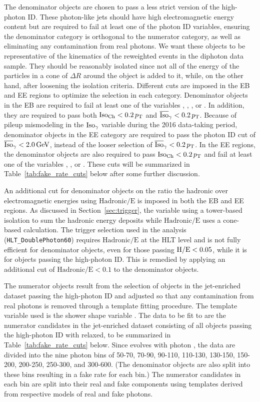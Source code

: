 The denominator objects are chosen to pass a less strict version of the high-\pt photon ID. These photon-like jets should have high electromagnetic energy content but are required to fail at least one of the photon ID variables, ensuring the denominator category is orthogonal to the numerator category, as well as eliminating any contamination from real photons. We want these objects to be representative of the kinematics of the reweighted events in the diphoton data sample. They should be reasonably isolated since not all of the energy of the particles in a cone of $\Delta R$ around the object is added to it, while, on the other hand,  after loosening the isolation criteria. Different cuts are imposed in the EB and EE regions to optimize the selection in each category. Denominator objects in the EB are required to fail at least one of the variables \hoe, \sieie, \chiso, or \corphoiso. In addition, they are required to pass both $\text{Iso}_{\text{Ch}} < 0.2\,p_{\mathrm{T}}$ and $\overline{\mbox{Iso}}_\gamma < 0.2\,p_{\mathrm{T}}$. Because of pileup mismodeling in the $\text{Iso}_{\gamma}$ variable during the 2016 data-taking period, denominator objects in the EE category are required to pass the photon ID cut of $\overline{\mbox{Iso}}_\gamma < 2.0\,\text{Ge\hspace{-.08em}V}$, instead of the looser selection of $\overline{\mbox{Iso}}_\gamma < 0.2\,p_{\mathrm{T}}$. In the EE regions, the denominator objects are also required to pass $\text{Iso}_{\text{Ch}} < 0.2\,p_{\mathrm{T}}$ and fail at least one of the variables \hoe, \sieie, or \chiso. These cuts will be summarized in Table~\ref{tab:fake_rate_cuts} below after some further discussion.

An additional cut for denominator objects on the ratio the hadronic over electromagnetic energies using $\text{Hadronic/E}$ is imposed in both the EB and EE regions. As discussed in Section~\ref{sec:trigger}, the variable \hoe using a tower-based isolation to sum the hadronic energy deposits while $\text{Hadronic/E}$ uses a cone-based calculation. The trigger selection used in the analysis (\texttt{HLT\_DoublePhoton60}) requires $\text{Hadronic/E}$ at the HLT level and is not fully efficient for denominator objects, even for those passing $\mathrm{H/E} < 0.05$, while it is for objects passing the high-\pt photon ID. This is remedied by applying an additional cut of $\text{Hadronic/E} < 0.1$ to the denominator objects.

The numerator objects result from the selection of objects in the jet-enriched dataset passing the high-\pt photon ID and adjusted so that any contamination from real photons is removed through a template fitting procedure. The template variable used is the shower shape variable \sieie. The data to be fit to are the numerator candidates in the jet-enriched dataset consisting of all objects passing the high-\pt photon ID with \sieie relaxed, to be summarized in Table~\ref{tab:fake_rate_cuts} below. Since \sieie evolves with photon \pt, the data are divided into the nine photon \pt bins of 50-70, 70-90, 90-110, 110-130, 130-150, 150-200, 200-250, 250-300, and 300-600\GeV. (The denominator objects are also split into these bins resulting in a fake rate for each bin.) The numerator candidates in each \pt bin are split into their real and fake components using templates derived from respective models of real and fake photons.


